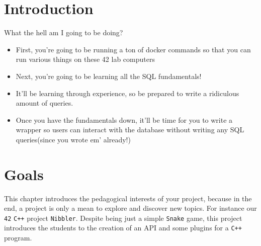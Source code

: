 \documentclass{42-en}
\begin{document}
\chapter{Introduction}

	What the hell am I going to be doing?

	\begin{itemize}\itemsep1pt
		\item First, you're going to be running a ton of docker commands 
			so that you can run various things on these 42 lab computers
		\item Next, you're going to be learning all the SQL fundamentals! 
		\item It'll be learning through experience, so be prepared to write 
			a ridiculous amount of queries. 
		\item Once you have the fundamentals down, it'll be time for you to 
			write a wrapper so users can interact with the database 
			without writing any SQL queries(since you wrote em' already!) 
	\end{itemize}


\chapter{Goals}

    This chapter introduces the pedagogical interests of your project,
    because in the end, a project is only a mean to explore and
    discover new topics. For instance our \texttt{42} \texttt{C++}
    project \texttt{Nibbler}. Despite being just a simple
    \texttt{Snake} game, this project introduces the students to the
    creation of an API and some plugins for a \texttt{C++} program.


\end{document}
